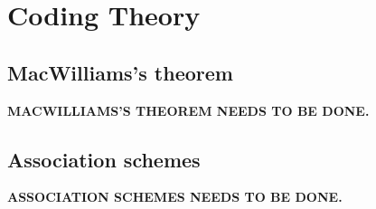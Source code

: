 \chapter{Coding Theory}
\label{ch:18}
\section{MacWilliams's theorem}
\label{sec:18-1}

\noindent\textbf{MACWILLIAMS'S THEOREM NEEDS TO BE DONE.}


\section{Association schemes}
\label{sec:18-2}

\noindent\textbf{ASSOCIATION SCHEMES NEEDS TO BE DONE.}


